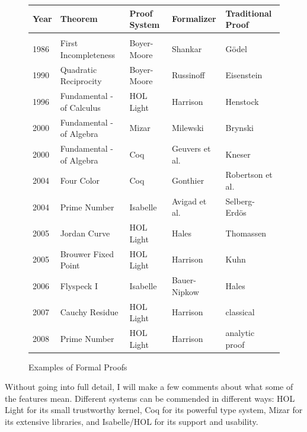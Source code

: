 \documentclass{llncs}
\begin{document}
\begin{figure}[h!]
\centering
\begin{tabular}{l l l l l}
\hline
Year\hspace{0.5em} &Theorem\hspace{8em} &Proof System\hspace{2em}  &Formalizer\hspace{3em} &Traditional Proof\\ [0.5ex]
\hline \\
1986 &First Incompleteness &Boyer-Moore   &Shankar &G\"odel \\
1990 &Quadratic Reciprocity&Boyer-Moore &Russinoff &Eisenstein\\
1996 &Fundamental - of Calculus &HOL Light &Harrison &Henstock\\
2000 &Fundamental - of Algebra &Mizar &Milewski    &Brynski\\ 
2000 &Fundamental - of Algebra &Coq &Geuvers et al.   &Kneser\\
2004 &Four Color &Coq &Gonthier &Robertson et al.\\
2004 &Prime Number &Isabelle &Avigad et al. &Selberg-Erd\"os\\
2005 &Jordan Curve  &HOL Light &Hales &Thomassen \\
2005 &Brouwer Fixed Point &HOL Light &Harrison &Kuhn \\
2006 &Flyspeck I &Isabelle &Bauer-Nipkow &Hales \\
2007 &Cauchy Residue &HOL Light &Harrison &classical \\
2008 &Prime Number &HOL Light &Harrison &analytic proof \\
 [1ex]
\hline
\end{tabular}
\caption{Examples of Formal Proofs}
\label{fig:table}
\end{figure}


Without going into full detail, I will make a few comments about what
some of the features mean.  Different systems can be commended in
different ways: HOL Light for its small trustworthy kernel, Coq for
its powerful type system, Mizar for its extensive libraries, and
Isabelle/HOL for its support and usability.
\end{document}
